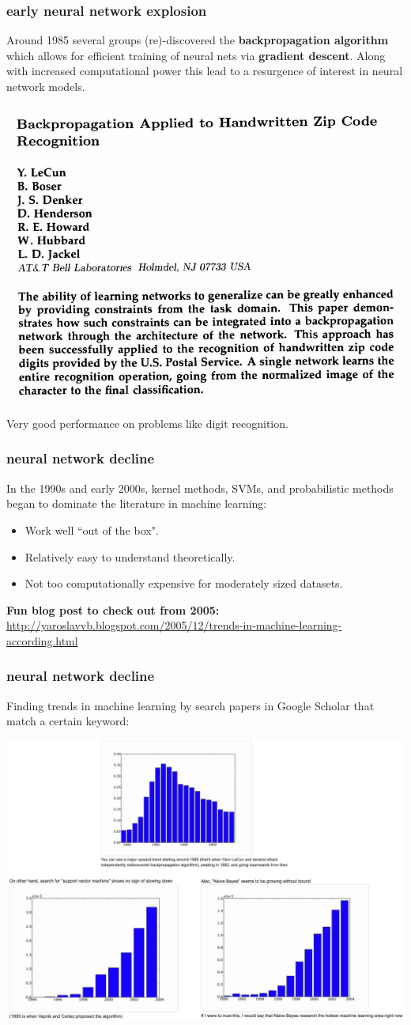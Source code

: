 \documentclass[handout,compress]{beamer}
\begin{document}
\begin{frame}
	\frametitle{early neural network explosion}
	Around 1985 several groups (re)-discovered the \textbf{backpropagation algorithm} which allows for efficient training of neural nets via \textbf{gradient descent}. Along with increased computational power this lead to a resurgence of interest in neural network models. 
	\begin{center}		
		\includegraphics[width=.5\textwidth]{mnistbackprop.png}
	\end{center}
Very good performance on problems like digit recognition.
\end{frame}

\begin{frame}
	\frametitle{neural network decline}
	In the 1990s and early 2000s, kernel methods, SVMs, and probabilistic methods began to dominate the literature in machine learning:
	\begin{itemize}
		\item Work well ``out of the box".
		\item Relatively easy to understand theoretically.
		\item Not too computationally expensive for moderately sized datasets. 
	\end{itemize}
\textbf{Fun blog post to check out from 2005:} \url{http://yaroslavvb.blogspot.com/2005/12/trends-in-machine-learning-according.html}
\end{frame}

\begin{frame}
	\frametitle{neural network decline}
		\footnotesize
	Finding trends in machine learning by search papers in Google Scholar that match a certain keyword:
	\begin{center}		
		\includegraphics[width=.9\textwidth]{trends.png}
	\end{center}
\end{frame}
\end{document}
